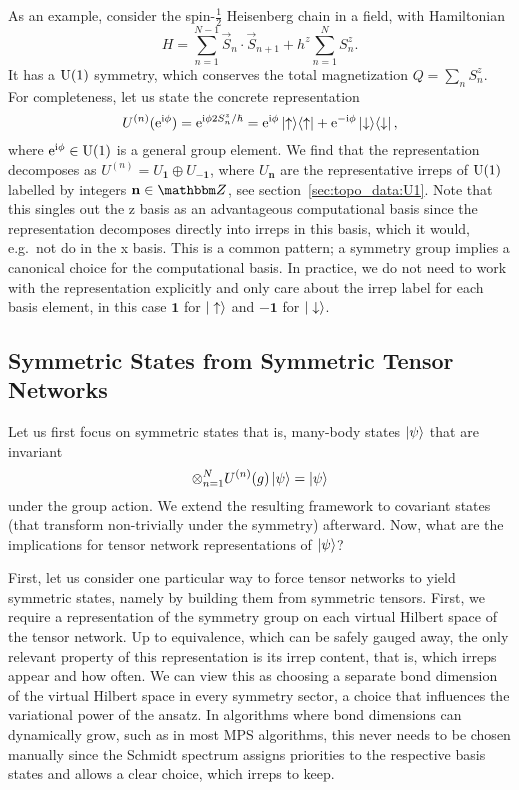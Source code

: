 As an example, consider the spin-$\tfrac{1}{2}$ Heisenberg chain in a field, with Hamiltonian
\begin{equation}
    H = \sum_{n=1}^{N-1} \Vec{S}_n \cdot \Vec{S}_{n+1} + h^z \sum_{n=1}^N S_n^z
    .
\end{equation}
It has a $\mathrm{U}(1)$ symmetry, which conserves the total magnetization $Q = \sum_n S_n^z$.
%
For completeness, let us state the concrete representation
\begin{equation}
    U^{(n)}(\eto{\im\phi})
    = \eto{\im\phi 2 S_n^z / \hbar}
    = \eto{\im\phi} \ketbra{\uparrow}{\uparrow} + \eto{-\im\phi} \ketbra{\downarrow}{\downarrow}
    ,
\end{equation}
where $\mathrm{e}^{\mathrm{i}\phi} \in \mathrm{U}(1)$ is a general group element.
%
We find that the representation decomposes as $U^{(n)} = U_\mathbf{1} \oplus U_\mathbf{-1}$, where $U_\mathbf{n}$ are the representative irreps of $\mathrm{U}(1)$ labelled by integers $\mathbf{n} \in \Zbb$, see section~\ref{sec:topo_data:U1}.
%
Note that this singles out the z basis as an advantageous computational basis since the representation decomposes directly into irreps in this basis, which it would, e.g.~not do in the x basis.
%
This is a common pattern; a symmetry group implies a canonical choice for the computational basis.
%
In practice, we do not need to work with the representation explicitly and only care about the irrep label for each basis element, in this case $\mathbf{1}$ for $\ket{\uparrow}$ and $\mathbf{-1}$ for $\ket{\downarrow}$.


\subsection{Symmetric States from Symmetric Tensor Networks}

Let us first focus on symmetric states that is, many-body states $\ket{\psi}$ that are invariant 
\begin{equation}
    \otimes_{n=1}^{N} U^{(n)}(g) \ket{\psi} = \ket{\psi}    
\end{equation}
under the group action.
%
We extend the resulting framework to covariant states (that transform non-trivially under the symmetry) afterward.
%
Now, what are the implications for tensor network representations of $\ket{\psi}$?

First, let us consider one particular way to force tensor networks to yield symmetric states, namely by building them from symmetric tensors.
%
First, we require a representation of the symmetry group on each virtual Hilbert space of the tensor network.
%
Up to equivalence, which can be safely gauged away, the only relevant property of this representation is its irrep content, that is, which irreps appear and how often.
%
We can view this as choosing a separate bond dimension of the virtual Hilbert space in every symmetry sector, a choice that influences the variational power of the ansatz.
%
In algorithms where bond dimensions can dynamically grow, such as in most MPS algorithms, this never needs to be chosen manually since the Schmidt spectrum assigns priorities to the respective basis states and allows a clear choice, which irreps to keep.

